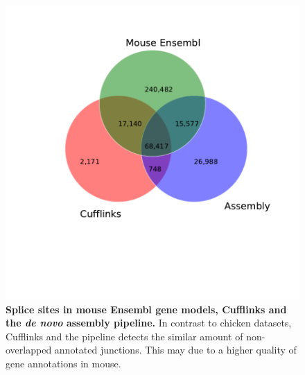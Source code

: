 \documentclass[10pt]{article}
\begin{document}
\begin{figure}[!ht]
\begin{center}
\includegraphics[width=5in]{mus_venn.pdf}
\end{center}
\caption{
{\bf Splice sites in mouse Ensembl gene models, Cufflinks and the \emph{de novo} assembly pipeline.}
In contrast to chicken datasets, Cufflinks and the pipeline detects the similar amount of non-overlapped annotated junctions.
This may due to a higher quality of gene annotations in mouse.
}
\label{mus_venn}
\end{figure}
\end{document}
